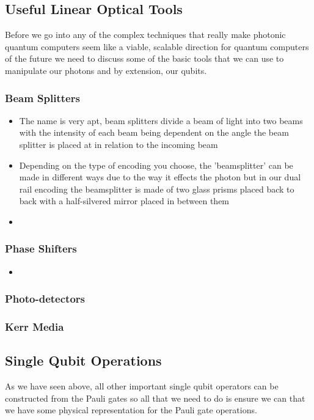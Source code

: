 
\subsection{Useful Linear Optical Tools}
Before we go into any of the complex techniques that really make photonic quantum computers seem like a viable, scalable direction for quantum computers of the future we need to discuss some of the basic tools that we can use to manipulate our photons and by extension, our qubits.
\subsubsection{Beam Splitters}
\begin{itemize}
    \item The name is very apt, beam splitters divide a beam of light into two beams with the intensity of each beam being dependent on the angle the beam splitter is placed at in relation to the incoming beam
    \item Depending on the type of encoding you choose, the 'beamsplitter' can be made in different ways due to the way it effects the photon but in our dual rail encoding the beamsplitter is made of two glass prisms placed back to back with a half-silvered mirror placed in between them %
    \item 
\end{itemize}
\subsubsection{Phase Shifters}
\begin{itemize}
    \item 
\end{itemize}
\subsubsection{Photo-detectors}
\subsubsection{Kerr Media}


\subsection{Single Qubit Operations}
As we have seen above, all other important single qubit operators can be constructed from the Pauli gates so all that we need to do is ensure we can that we have some physical representation for the Pauli gate operations.
